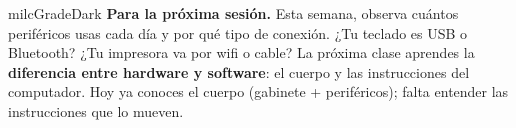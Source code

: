 \documentclass[11pt,letterpaper]{article}
\begin{document}
\begin{infoband}{milcGradeDark}
\textbf{Para la próxima sesión.} Esta semana, observa cuántos periféricos usas cada día y por qué tipo de conexión. ¿Tu teclado es USB o Bluetooth? ¿Tu impresora va por wifi o cable? La próxima clase aprendes la \textbf{diferencia entre hardware y software}: el cuerpo y las instrucciones del computador. Hoy ya conoces el cuerpo (gabinete + periféricos); falta entender las instrucciones que lo mueven.
\end{infoband}
\end{document}
